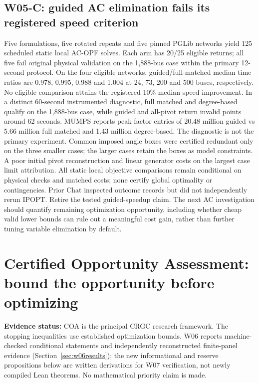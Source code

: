 \documentclass[11pt,letterpaper]{article}
\newcommand{\status}[1]{\textbf{Evidence status:} #1}
\begin{document}
\subsection{W05-C: guided AC elimination fails its registered speed criterion}
Five formulations, five rotated repeats and five pinned PGLib networks yield 125 scheduled static local AC-OPF solves. Each arm has 20/25 eligible returns; all five fail original physical validation on the 1,888-bus case within the primary 12-second protocol. On the four eligible networks, guided/full-matched median time ratios are 0.978, 0.995, 0.988 and 1.004 at 24, 73, 200 and 500 buses, respectively. No eligible comparison attains the registered 10\% median speed improvement. In a distinct 60-second instrumented diagnostic, full matched and degree-based qualify on the 1,888-bus case, while guided and all-pivot return invalid points around 62 seconds. MUMPS reports peak factor entries of 20.48 million guided vs 5.66 million full matched and 1.43 million degree-based. The diagnostic is not the primary experiment. Common imposed angle boxes were certified redundant only on the three smaller cases; the larger cases retain the boxes as model constraints. A poor initial pivot reconstruction and linear generator costs on the largest case limit attribution. All static local objective comparisons remain conditional on physical checks and matched costs; none certify global optimality or contingencies. Prior Chat inspected outcome records but did not independently rerun IPOPT. Retire the tested guided-speedup claim. The next AC investigation should quantify remaining optimization opportunity, including whether cheap valid lower bounds can rule out a meaningful cost gain, rather than further tuning variable elimination by default.

\section{Certified Opportunity Assessment: bound the opportunity before optimizing}
\label{sec:coa}
\status{COA is the principal CRGC research framework. The stopping inequalities use established optimization bounds. W06 reports machine-checked conditional statements and independently reconstructed finite-panel evidence (Section~\ref{sec:w06results}); the new informational and reserve propositions below are written derivations for W07 verification, not newly compiled Lean theorems. No mathematical priority claim is made.}
\end{document}
